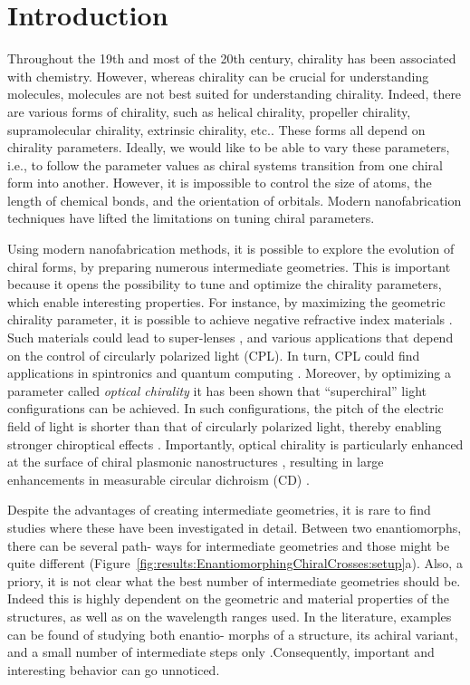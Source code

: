\section{Introduction}\label{sec:results:EnantiomorphingChiralCrosses:introduction}
Throughout the 19th and most of the 20th century, chirality has been associated with chemistry. However, whereas chirality can be crucial for understanding molecules, molecules are not best suited for understanding chirality. Indeed, there are various forms of chirality, such as helical chirality, propeller chirality, supramolecular chirality, extrinsic chirality, etc.\cite{Collins2017, Valev2013b}. These forms all depend on chirality parameters. 
Ideally, we would like to be able to vary these parameters, i.e., to follow the parameter values as chiral systems transition from one chiral form into another. However, it is impossible to control the size of atoms, the length of chemical bonds, and the orientation of orbitals. Modern nanofabrication techniques have lifted the limitations on tuning chiral parameters.

Using modern nanofabrication methods, it is possible to explore the evolution of chiral forms, by preparing numerous intermediate geometries. This is important because it opens the possibility to tune and optimize the chirality parameters, which enable interesting properties. For instance, by maximizing the geometric chirality parameter, it is possible to achieve negative refractive index materials \cite{Pendry2004a}. Such materials could lead to super-lenses \cite{Khorasaninejad2016}, and various applications that depend on the control of circularly polarized light (CPL). In turn, CPL could find applications in spintronics \cite{Farshchi2011b} and quantum computing \cite{Wagenknecht2010a, Sherson2006a}.
Moreover, by optimizing a parameter called \textit{optical chirality} \cite{Tang2010} it has been shown that “superchiral” light configurations can be achieved. In such configurations, the pitch of the electric field of light is shorter than that of circularly polarized light, thereby enabling stronger chiroptical effects \cite{Hendry2010, Hendry2012, Tullius2015}. Importantly, optical chirality is particularly enhanced at the surface of chiral plasmonic nanostructures \cite{Schaferling2012, Karimullah2015}, resulting in large enhancements in measurable circular dichroism (CD) \cite{Maoz2013, Wang2014c, Ma2013b, Zhang2013}.

Despite the advantages of creating intermediate geometries, it is rare to find studies where these have been investigated in detail. Between two enantiomorphs, there can be several path- ways for intermediate geometries and those might be quite different (Figure~\ref{fig:results:EnantiomorphingChiralCrosses:setup}a). 
Also, a priory, it is not clear what the best number of intermediate geometries should be. Indeed this is highly dependent on the geometric and material properties of the structures, as well as on the wavelength ranges used. In the literature, examples can be found of studying both enantio- morphs of a structure, its achiral variant, and a small number of intermediate steps only \cite{Zu2016}.Consequently, important and interesting behavior can go unnoticed.

